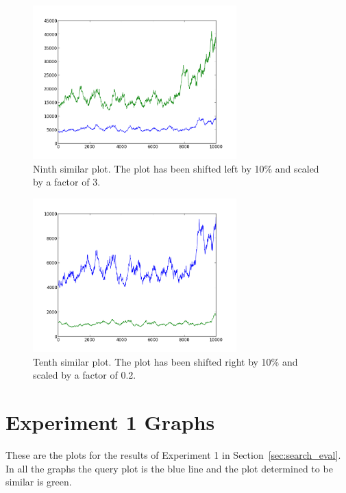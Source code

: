 \begin{figure}[h!]
    \centering
    \includegraphics[width=0.7\textwidth]{images/mutant_9.png}
    \caption{Ninth similar plot.  The plot has been shifted left by 10\% and scaled by a factor of 3.}
    \label{fig:mutant_9}
\end{figure}

\begin{figure}[h!]
    \centering
    \includegraphics[width=0.7\textwidth]{images/mutant_10.png}
    \caption{Tenth similar plot.  The plot has been shifted right by 10\% and scaled by a factor of 0.2.}
    \label{fig:mutant_10}
\end{figure}

\clearpage

\section{Experiment 1 Graphs}
\label{sec:experiment1}

These are the plots for the results of Experiment 1 in Section~\ref{sec:search_eval}.  In all the graphs the query plot is the blue line and the plot determined to be similar is green.

